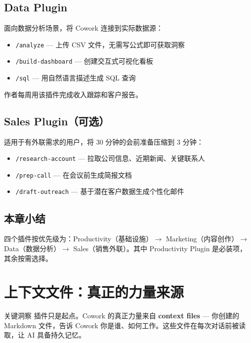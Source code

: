 \documentclass[a4paper]{article}
\begin{document}
\subsection{Data Plugin}

面向数据分析场景，将 Cowork 连接到实际数据源：

\begin{itemize}
    \item \texttt{/analyze} --- 上传 CSV 文件，无需写公式即可获取洞察
    \item \texttt{/build-dashboard} --- 创建交互式可视化看板
    \item \texttt{/sql} --- 用自然语言描述生成 SQL 查询
\end{itemize}

作者每周用该插件完成收入跟踪和客户报告。

\subsection{Sales Plugin（可选）}

适用于有外联需求的用户，将 30 分钟的会前准备压缩到 3 分钟：

\begin{itemize}
    \item \texttt{/research-account} --- 拉取公司信息、近期新闻、关键联系人
    \item \texttt{/prep-call} --- 在会议前生成简报文档
    \item \texttt{/draft-outreach} --- 基于潜在客户数据生成个性化邮件
\end{itemize}

\subsection{本章小结}

四个插件按优先级为：Productivity（基础设施）$\to$ Marketing（内容创作）$\to$ Data（数据分析）$\to$ Sales（销售外联）。其中 Productivity Plugin 是必装项，其余按需选择。

\section{上下文文件：真正的力量来源}

\begin{importantbox}{关键洞察}
插件只是起点。Cowork 的真正力量来自 \textbf{context files} --- 你创建的 Markdown 文件，告诉 Cowork 你是谁、如何工作。这些文件在每次对话前被读取，让 AI 具备持久记忆。
\end{importantbox}
\end{document}
